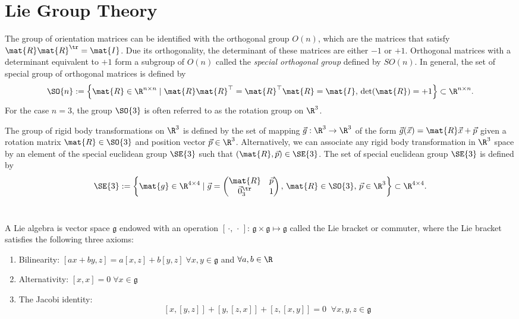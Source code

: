 \chapter{Lie Group Theory}

\begin{definition} The group of orientation matrices can be identified with the orthogonal group $O(n)$, which are the matrices that satisfy $\mat{R}\mat{R}^\tr = \mat{I}$. Due its orthogonality, the determinant of these matrices are either $-1$ or $+1$. Orthogonal matrices with a determinant equivalent to $+1$ form a subgroup of $O(n)$ called the \textit{special orthogonal group} defined by $SO(n)$. In general, the set of special group of orthogonal matrices is defined by
\begin{equation}
\SO{n}:= \left\{ \mat{R}\in \R^{n \times n} \; | \; {\mat{R}} \mat{R}^\top = {\mat{R}}^\top \mat{R} = \mat{I}, \, \det(\mat{R}) = +1 \right\} \subset \R^{n\times n}.
\end{equation}
For the case $n = 3$, the group $\SO{3}$ is often referred to as the rotation group on $\R^3$.
\end{definition}

\begin{definition} The group of rigid body transformations on $\R^3$ is defined by the set of mapping $\vec{g}: \R^3 \to \R^3$ of the form $\vec{g} (\vec{x}) = \mat{R} \vec{x} + \vec{p}$ given a rotation matrix $\mat{R} \in \SO{3}$ and position vector $\vec{p} \in \R^3$. Alternatively, we can associate any rigid body transformation in $\R^3$ space by an element of the special euclidean group $\SE{3}$ such that $(\mat{R},\vec{p}) \in \SE{3}$. The set of special euclidean group $\SE{3}$ is defined by
\begin{equation}
\SE{3} := \left\{ \mat{g} \in \R^{4 \times 4} \;|\; \vec{g} = \begin{pmatrix} \mat{R} & \vec{p} \\ \vec{0}_3^\tr & 1 \end{pmatrix}, \, \mat{R} \in \SO{3},\, \vec{p} \in \R^3 \right\} \subset \R^{4\times 4}.
\end{equation}\
\end{definition}

\begin{definition}[The Lie algebra] A Lie algebra is vector space $\mathfrak{g}$ endowed with an operation $[\,\cdot,\,\cdot\,]:\, \mathfrak{g} \times \mathfrak{g} \mapsto \mathfrak{g}$ called the Lie bracket or commuter, where the Lie bracket satisfies the following three axioms: 
\begin{enumerate}
\itemsep0.5em 
\item Bilinearity: $[ax + by,z] = a[x,z] + b[y,z] \; \forall x,y\in \mathfrak{g}$ and $\forall a,b \in \R$
\item Alternativity: $[x,x] =  0 \; \forall x\in \mathfrak{g}$
\item The Jacobi identity: $$ [x,[y,z]] + [y,[z,x]] + [z,[x,y]] = 0 \;\; \forall x,y,z\in \mathfrak{g}$$
\end{enumerate}
\end{definition}

